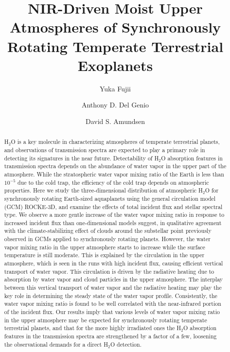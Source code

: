 \documentclass[11pt,numberedappendix,twocolappendix,]{emulateapj}
\begin{document}

\title{NIR-Driven Moist Upper Atmospheres of Synchronously Rotating Temperate Terrestrial Exoplanets}

\author{Yuka Fujii}

\author{Anthony D. Del Genio}

\author{David S. Amundsen}


\begin{abstract}
%
H$_2$O is a key molecule in characterizing atmospheres of temperate terrestrial planets, and observations of transmission spectra are expected to play a primary role in detecting its signatures in the near future. 
Detectability of H$_2$O absorption features in transmission spectra depends on the abundance of water vapor in the upper part of the atmosphere. 
While the stratospheric water vapor mixing ratio of the Earth is less than $10^{-5}$ due to the cold trap, the efficiency of the cold trap depends on atmospheric properties. 
Here we study the three-dimensional distribution of atmospheric H$_2$O for synchronously rotating Earth-sized aquaplanets using the general circulation model (GCM) ROCKE-3D, and examine the effects of total incident flux and stellar spectral type.  
We observe a more gentle increase of the water vapor mixing ratio in response to increased incident flux than one-dimensional models suggest, in qualitative agreement with the climate-stabilizing effect of clouds around the substellar point previously observed in GCMs applied to synchronously rotating planets. 
However, the water vapor mixing ratio in the upper atmosphere starts to increase while the surface temperature is still moderate. 
This is explained by the circulation in the upper atmosphere, which is seen in the runs with high incident flux, causing efficient vertical transport of water vapor. 
This circulation is driven by the radiative heating due to absorption by water vapor and cloud particles in the upper atmosphere. 
The interplay between this vertical transport of water vapor and the radiative heating may play the key role in determining the steady state of the water vapor profile. 
Consistently, the water vapor mixing ratio is found to be well correlated with the near-infrared portion of the incident flux. 
Our results imply that various levels of water vapor mixing ratio in the upper atmosphere may be expected for synchronously rotating temperate terrestrial planets, and that for the more highly irradiated ones the H$_2$O absorption features in the transmission spectra are strengthened by a factor of a few, loosening the observational demands for a direct H$_2$O detection. 
%
\end{abstract}
\end{document}
